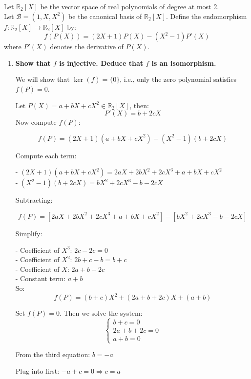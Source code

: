 \documentclass[12pt]{article}
\begin{document}
\newpage

\begin{answerbox}
Let $ \mathbb{R}_2[X] $ be the vector space of real polynomials of degree at most 2. \\ 
Let $ \mathcal{B} = (1, X, X^2) $ be the canonical basis of $ \mathbb{R}_2[X] $.  
Define the endomorphism $ f : \mathbb{R}_2[X] \to \mathbb{R}_2[X] $ by:
$$
f(P(X)) = (2X + 1)P(X) - (X^2 - 1)P'(X)
$$
where $ P'(X) $ denotes the derivative of $ P(X) $.

\begin{enumerate}

\item \textbf{Show that $ f $ is injective. Deduce that $ f $ is an isomorphism.}

We will show that $ \ker(f) = \{0\} $, i.e., only the zero polynomial satisfies $ f(P) = 0 $.

Let $ P(X) = a + bX + cX^2 \in \mathbb{R}_2[X] $, then:
$$
P'(X) = b + 2cX
$$
Now compute $ f(P) $:

$$
f(P) = (2X + 1)(a + bX + cX^2) - (X^2 - 1)(b + 2cX)
$$

Compute each term:

- $ (2X + 1)(a + bX + cX^2) = 2aX + 2bX^2 + 2cX^3 + a + bX + cX^2 $ \\
- $ (X^2 - 1)(b + 2cX) = bX^2 + 2cX^3 - b - 2cX $

Subtracting:

$$
f(P) = [2aX + 2bX^2 + 2cX^3 + a + bX + cX^2] - [bX^2 + 2cX^3 - b - 2cX]
$$

Simplify:

- Coefficient of $ X^3 $: $ 2c - 2c = 0 $ \\
- Coefficient of $ X^2 $: $ 2b + c - b = b + c $ \\
- Coefficient of $ X $: $ 2a + b + 2c $ \\
- Constant term: $ a + b $ \\

So:
$$
f(P) = (b + c)X^2 + (2a + b + 2c)X + (a + b)
$$

Set $ f(P) = 0 $. Then we solve the system:
$$
\begin{cases}
b + c = 0 \\
2a + b + 2c = 0 \\
a + b = 0
\end{cases}
$$

From the third equation: $ b = -a $

Plug into first: $ -a + c = 0 \Rightarrow c = a $


\end{enumerate}
\end{answerbox}
\end{document}
